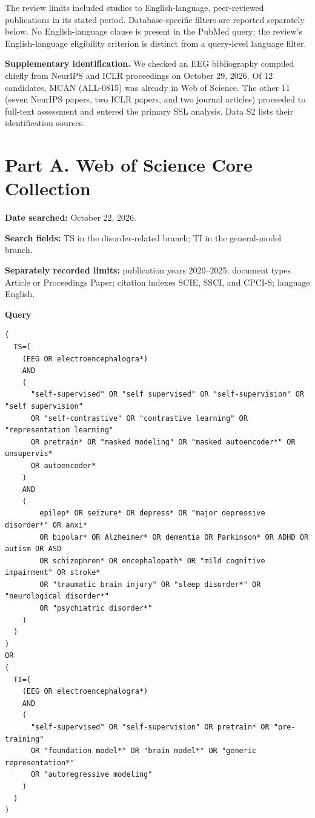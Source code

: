 \documentclass[11pt,letterpaper]{article}
\begin{document}
The review limits included studies to English-language, peer-reviewed publications in its stated period. Database-specific filters are reported separately below. No English-language clause is present in the PubMed query; the review's English-language eligibility criterion is distinct from a query-level language filter.

\textbf{Supplementary identification.} We checked an EEG bibliography compiled chiefly from NeurIPS and ICLR proceedings on October 29, 2026. Of 12 candidates, MCAN (ALL-0815) was already in Web of Science. The other 11 (seven NeurIPS papers, two ICLR papers, and two journal articles) proceeded to full-text assessment and entered the primary SSL analysis. Data S2 lists their identification sources.

\clearpage
\section*{Part A. Web of Science Core Collection}
\textbf{Date searched:} October 22, 2026.

\textbf{Search fields:} TS in the disorder-related branch; TI in the general-model branch.

\textbf{Separately recorded limits:} publication years 2020--2025; document types Article or Proceedings Paper; citation indexes SCIE, SSCI, and CPCI-S; language English.

\textbf{Query}
\begin{Verbatim}[fontsize=\fontsize{8.5}{10}\selectfont,breaklines=true,breakanywhere=false,breaksymbolleft={},breaksymbolright={},frame=single,framesep=6pt]
(
  TS=(
    (EEG OR electroencephalogra*)
    AND
    (
      "self-supervised" OR "self supervised" OR "self-supervision" OR "self supervision"
      OR "self-contrastive" OR "contrastive learning" OR "representation learning"
      OR pretrain* OR "masked modeling" OR "masked autoencoder*" OR unsupervis*
      OR autoencoder*
    )
    AND
    (
        epilep* OR seizure* OR depress* OR "major depressive disorder*" OR anxi*
        OR bipolar* OR Alzheimer* OR dementia OR Parkinson* OR ADHD OR autism OR ASD
        OR schizophren* OR encephalopath* OR "mild cognitive impairment" OR stroke*
        OR "traumatic brain injury" OR "sleep disorder*" OR "neurological disorder*"
        OR "psychiatric disorder*"
    )
  )
)
OR
(
  TI=(
    (EEG OR electroencephalogra*)
    AND
    (
      "self-supervised" OR "self-supervision" OR pretrain* OR "pre-training"
      OR "foundation model*" OR "brain model*" OR "generic representation*"
      OR "autoregressive modeling"
    )
  )
)
\end{Verbatim}
\end{document}
